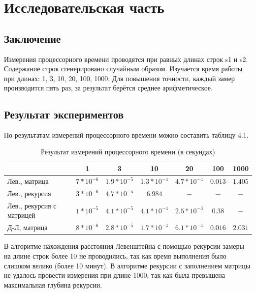 \documentclass[10pt,a4paper]{report}
\begin{document}
	
	
		
	\newpage
	\chapter*{Исследовательская часть}
	\setcounter{chapter}{4}
	
	\section*{Заключение}
	Измерения процессорного времени проводятся при равных длинах строк s1 и s2. Содержание строк сгенерировано случайным образом. Изучается время работы при длинах: 1, 3, 10, 20, 100, 1000. Для повышения точности, каждый замер производится пять раз, за результат берётся среднее арифметическое.
	
	\section*{Результат экспериментов}
	По результатам измерений процессорного времени можно составить таблицу 4.1.
	
	\begin{table}[h]
	\caption{Результат измерений процессорного времени (в секундах)}
	\begin{tabular}{| p{2cm} | c | c | c | c | c | c |}
		\hline
		& 1				&3				&10				&20				&100		&1000 \\
		\hline\hline
		Лев., матрица	&$7*10^{-6}$	&$1.9*10^{-5}$	&$1.3*10^{-4}$	&$4.7*10^{-4}$	&$0.013$	&$1.405$ \\
		\hline
		Лев., рекурсия	&$3*10^{-6}$	&$4.7*10^{-5}$	&$6.984$		&$-$			&$-$		&$-$ \\
		\hline
		Лев., рекурсия с матрицей
		&$1*10^{-5}$	&$4.1*10^{-5}$	&$4.1*10^{-4}$	&$2.5*10^{-3}$	&$0.38$		&$-$ \\
		\hline
		Д-Л, матрица	&$8*10^{-6}$	&$2.8*10^{-5}$	&$1.7*10^{-4}$	&$6.1*10^{-4}$	&$0.016$	&$2.031$ \\
		\hline
	\end{tabular}
	\end{table}

	В алгоритме нахождения расстояния Левенштейна с помощью рекурсии замеры на длине строк более 10 не проводились, так как время выполнения было слишком велико (более 10 минут). В алгоритме рекурсии с заполнением матрицы не удалось провести измерения при длине 1000, так как была превышена максимальная глубина рекурсии.
	
\end{document}
